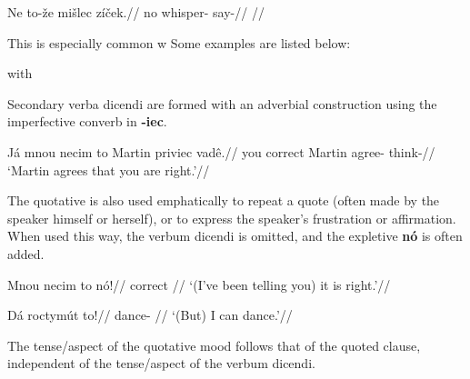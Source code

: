 \pex
\begingl
\gla Ne to-\v{z}e mi\v{s}lec z\'i\v{c}ek.//
\glb no  whisper- say-//
\glft {}//
\endgl
\xe

This is especially common w
Some examples are listed below:

\ex with 
\xe

\par Secondary verba dicendi are formed with an adverbial construction using the imperfective converb in \textbf{-iec}.

\pex
\begingl
\gla Já mnou necim to Martin priviec vadê.//
\glb you correct   Martin agree- think-//
\glft `Martin agrees that you are right.'//
\endgl
\xe

\par The quotative is also used emphatically to repeat a quote (often made by the speaker himself or herself), or to express the speaker's frustration or affirmation. When used this way, the verbum dicendi is omitted, and the expletive \textbf{nó} is often added.

\pex
\begingl
\gla Mnou necim to nó!//
\glb correct   //
\glft `(I've been telling you) it is right.'//
\endgl
\xe

\pex
\begingl
\gla Dá roctymút to!//
\glb {} dance- //
\glft `(But) I can dance.'//
\endgl
\xe

\par The tense/aspect of the quotative mood follows that of the quoted clause, independent of the tense/aspect of the verbum dicendi.
